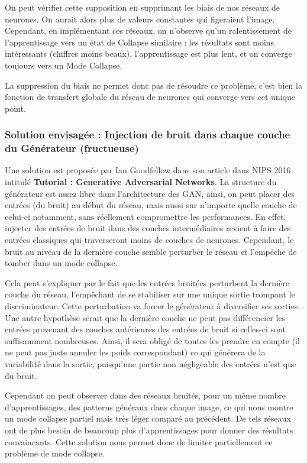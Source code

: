 On peut vérifier cette supposition en supprimant les biais de nos réseaux de neurones. On aurait alors plus de valeurs constantes qui figeraient l'image. Cependant, en implémentant ces réseaux, on n'observe qu'un ralentissement de l'apprentissage vers un état de Collapse similaire : les résultats sont moins intéressants (chiffres moins beaux), l'apprentissage est plus lent, et on converge toujours vers un Mode Collapse.

La suppression du biais ne permet donc pas de résoudre ce problème, c'est bien la fonction de transfert globale du réseau de neurones qui converge vers cet unique point.  


\subsubsection{Solution envisagée : Injection de bruit dans chaque couche du Générateur (fructueuse)}

Une solution est proposée par Ian Goodfellow dans son article dans NIPS 2016 intitulé \textbf{Tutorial : Generative Adversarial Networks}. La structure du générateur est assez libre dans l'architecture des GAN, ainsi, on peut placer des entrées (du bruit) au début du réseau, mais aussi sur n'importe quelle couche de celui-ci notamment, sans réellement compromettre les performances. En effet, injecter des entrées de bruit dans des couches intermédiaires revient à faire des entrées classiques qui traverseront moins de couches de neurones. Cependant, le bruit au niveau de la dernière couche semble perturber le réseau et l'empêche de tomber dans un mode collapse. 

Cela peut s'expliquer par le fait que les entrées bruitées perturbent la dernière couche du réseau, l'empêchant de se stabiliser sur une unique sortie trompant le discriminateur. Cette perturbation va forcer le générateur à diversifier ses sorties.
Une autre hypothèse serait que la dernière couche ne peut pas différencier les entrées provenant des couches antérieures des entrées de bruit si celles-ci sont suffisamment nombreuses. Ainsi, il sera obligé de toutes les prendre en compte (il ne peut pas juste annuler les poids correspondant) ce qui générera de la variabilité dans la sortie, puisqu'une partie non négligeable des entrées n'est que du bruit.

Cependant on peut observer dans des réseaux bruités, pour un même nombre d'apprentissages, des patterns généraux dans chaque image, ce qui nous montre un mode collapse partiel mais très léger comparé au précédent. De tels réseaux ont de plus besoin de beaucoup plus d'apprentissages pour donner des résultats convaincants. Cette solution nous permet donc de limiter partiellement ce problème de mode collapse.




